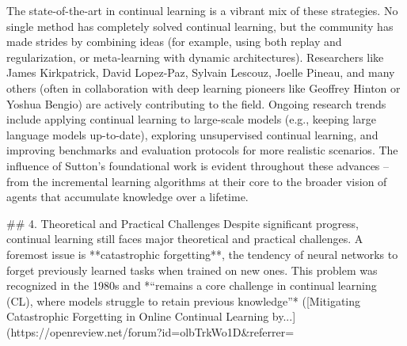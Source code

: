 The state-of-the-art in continual learning is a vibrant mix of these strategies. No single method has completely solved continual learning, but the community has made strides by combining ideas (for example, using both replay and regularization, or meta-learning with dynamic architectures). Researchers like James Kirkpatrick, David Lopez-Paz, Sylvain Lescouz, Joelle Pineau, and many others (often in collaboration with deep learning pioneers like Geoffrey Hinton or Yoshua Bengio) are actively contributing to the field. Ongoing research trends include applying continual learning to large-scale models (e.g., keeping large language models up-to-date), exploring unsupervised continual learning, and improving benchmarks and evaluation protocols for more realistic scenarios. The influence of Sutton’s foundational work is evident throughout these advances – from the incremental learning algorithms at their core to the broader vision of agents that accumulate knowledge over a lifetime.

## 4. Theoretical and Practical Challenges
Despite significant progress, continual learning still faces major theoretical and practical challenges. A foremost issue is **catastrophic forgetting**, the tendency of neural networks to forget previously learned tasks when trained on new ones. This problem was recognized in the 1980s and *“remains a core challenge in continual learning (CL), where models struggle to retain previous knowledge”* ([Mitigating Catastrophic Forgetting in Online Continual Learning by...](https://openreview.net/forum?id=olbTrkWo1D&referrer=%

